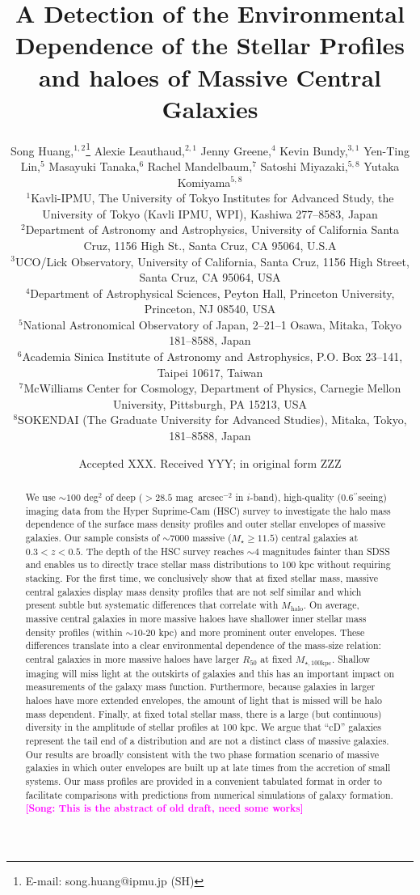 \documentclass[a4paper,fleqn,usenatbib]{mnras}
\title[Structure and Environment of Massive Galaxies]{
       A Detection of the Environmental Dependence of the Stellar Profiles and haloes
       of Massive Central Galaxies}
\author[S. Huang et al.]{
        Song Huang,$^{1,2}$\thanks{E-mail: song.huang@ipmu.jp (SH)}
        Alexie Leauthaud,$^{2,1}$
        Jenny Greene,$^{4}$
        Kevin Bundy,$^{3,1}$
        \newauthor
        Yen-Ting Lin,$^{5}$
        Masayuki Tanaka,$^{6}$
        Rachel Mandelbaum,$^{7}$
        Satoshi Miyazaki,$^{5,8}$
        \newauthor
        Yutaka Komiyama$^{5,8}$
        \\
        $^{1}$Kavli-IPMU, The University of Tokyo Institutes for Advanced Study, 
              the University of Tokyo (Kavli IPMU, WPI), Kashiwa 277--8583, Japan\\
        $^{2}$Department of Astronomy and Astrophysics, University of California 
              Santa Cruz, 1156 High St., Santa Cruz, CA 95064, U.S.A\\
        $^{3}$UCO/Lick Observatory, University of California, Santa Cruz,
              1156 High Street, Santa Cruz, CA 95064, USA\\
        $^{4}$Department of Astrophysical Sciences, Peyton Hall,
              Princeton University, Princeton, NJ 08540, USA \\
        $^{5}$National Astronomical Observatory of Japan, 2--21--1 Osawa, Mitaka, 
              Tokyo 181--8588, Japan\\
        $^{6}$Academia Sinica Institute of Astronomy and Astrophysics, 
              P.O. Box 23--141, Taipei 10617, Taiwan\\
        $^{7}$McWilliams Center for Cosmology, Department of Physics, 
              Carnegie Mellon University, Pittsburgh, PA 15213, USA\\
        $^{8}$SOKENDAI (The Graduate University for Advanced Studies), Mitaka,
              Tokyo, 181--8588, Japan
        }
\date{Accepted XXX. Received YYY; in original form ZZZ}
\def\asec{$^{\prime\prime}$}
\def\sb{mag~arcsec$^{-2}$}
\def\mstar{{$M_{\star}$}}
\def\mhalo{{$M_{\mathrm{halo}}$}}
\def\mtot{{$M_{\star,100\mathrm{kpc}}$}}
\newcommand{\song}[1]{\textcolor{magenta}{\textbf{[Song: #1]}}}
\begin{document}
\label{firstpage}
\pagerange{\pageref{firstpage}--\pageref{lastpage}}

\maketitle


\begin{abstract} 
    
    We use ${\sim}100$ deg$^2$ of deep ($>28.5$ \sb{} in $i$-band), high-quality 
    (0.6\asec seeing) imaging data from the Hyper Suprime-Cam (HSC) survey 
    to investigate the halo mass dependence of the surface mass density profiles 
    and outer stellar envelopes of massive galaxies. 
    Our sample consists of ${\sim}7000$ massive (\mstar{}$\geq 11.5$) central galaxies 
    at $0.3 < z < 0.5$. 
    The depth of the HSC survey reaches ${\sim}4$ magnitudes fainter than SDSS and 
    enables us to directly trace stellar mass distributions to 100 kpc without 
    requiring stacking. 
    For the first time, we conclusively show that at fixed stellar mass, massive central 
    galaxies display mass density profiles that are not self similar and which 
    present subtle but systematic differences that correlate with \mhalo{}. 
    On average, massive central galaxies in more massive haloes have shallower inner 
    stellar mass density profiles (within ${\sim}10$-$20$ kpc) and more prominent outer 
    envelopes. 
    These differences translate into a clear environmental dependence of the mass-size 
    relation: central galaxies in more massive haloes have larger $R_{\mathrm{50}}$ 
    at fixed \mtot{}. 
    Shallow imaging will miss light at the outskirts of galaxies and this has an 
    important impact on measurements of the galaxy mass function. 
    Furthermore, because galaxies in larger haloes have more extended envelopes, 
    the amount of light that is missed will be halo mass dependent. 
    Finally, at fixed total stellar mass, there is a large (but continuous) diversity 
    in the amplitude of stellar profiles at 100 kpc. 
    We argue that ``cD'' galaxies represent the tail end of a distribution and 
    are not a distinct class of massive galaxies. 
    Our results are broadly consistent with the two phase formation scenario of 
    massive galaxies in which outer envelopes are built up at late times from the 
    accretion of small systems. 
    Our mass profiles are provided in a convenient tabulated format in order to 
    facilitate comparisons with predictions from numerical simulations of galaxy 
    formation. 
    \song{This is the abstract of old draft, need some works}
    
\end{abstract}
\end{document}
